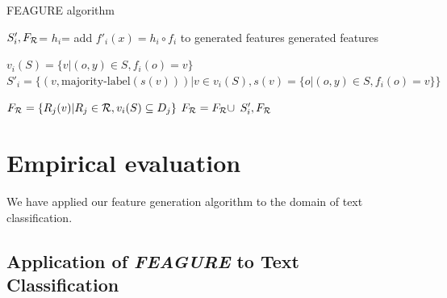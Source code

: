\documentclass{article}
\theoremstyle{definition}
\begin{document}
\begin{algorithm}[H]
	\caption{FEAGURE algorithm}
	\label{code-creating-prob}
	\small
	\begin{algorithmic}
		\State $S'_i,F_{\cal R}$=  %
		\State $h_i$=  
		\State add $f'_i(x)=h_i\circ f_i$ to generated features
		\EndFor
		\State \Return generated features
		\EndFunction

		\State $v_i(S) = \{v | (o,y) \in S, f_{i}(o)=v\}$
		\State 	$S'_i = \{ (v, \mbox{majority-label}(s(v))) | v \in v_i(S),
			s(v)=\{o | (o,y)\in S, f_{i}(o)=v\} \}$
		
		
		\State $F_{\cal R}=\{R_j(v)| R_j\in{\cal R}, v_i(S)\subseteq D_j\}$
		 $F_{\cal R}=F_{\cal R}\cup$
		\EndIf
		\State \Return $S'_i, F_{\cal R}$ 
		\EndFunction
		
	\end{algorithmic}
\end{algorithm}


\section{Empirical evaluation}
We have applied our feature generation algorithm to the domain of text classification.

\subsection{Application of \emph{FEAGURE} to Text Classification} \label{text-feagure}

\end{document}
